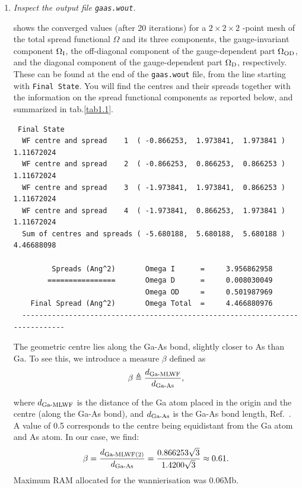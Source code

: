 \begin{enumerate}

\item {\it Inspect the output file {\tt gaas.wout}.}

 shows the converged values (after 20 iterations) for a $2\times2\times2$ \bfk-point mesh of the total spread functional $\Omega$ and its three components, \ie{} the gauge-invariant component $\Omega\tinysub{I}$, the off-diagonal component of the gauge-dependent part $\Omega\tinysub{OD}$, and the diagonal component of the gauge-dependent part $\Omega\tinysub{D}$, respectively. These can be found at the end of the {\tt gaas.wout} file, from the line starting with {\tt Final State}. You will find the \MLWF{} centres and their spreads together with the information on the spread functional components as reported below, and summarized in tab.\ref{tab1.1}.
\begin{tcolorbox}[sharp corners,boxrule=0.5pt]
{\small
\begin{verbatim}
 Final State
  WF centre and spread    1  ( -0.866253,  1.973841,  1.973841 )     1.11672024
  WF centre and spread    2  ( -0.866253,  0.866253,  0.866253 )     1.11672024
  WF centre and spread    3  ( -1.973841,  1.973841,  0.866253 )     1.11672024
  WF centre and spread    4  ( -1.973841,  0.866253,  1.973841 )     1.11672024
  Sum of centres and spreads ( -5.680188,  5.680188,  5.680188 )     4.46688098
  
         Spreads (Ang^2)       Omega I      =     3.956862958
        ================       Omega D      =     0.008030049
                               Omega OD     =     0.501987969
    Final Spread (Ang^2)       Omega Total  =     4.466880976
  -----------------------------------------------------------------------------
\end{verbatim}
}
\end{tcolorbox}
The geometric centre lies along the Ga-As bond, slightly closer to As than Ga. To see this, we introduce a measure $\beta$ defined as 
$$\beta \triangleq \frac{d\tinysub{Ga-MLWF}}{d\tinysub{Ga-As}},$$

where $d\tinysub{Ga-MLWF}$ is the distance of the Ga atom placed in the origin and the \MLWF{} centre (along the Ga-As bond), and $d\tinysub{Ga-As}$ is the Ga-As bond length, \cf{} Ref.~\cite{marzarivanderbilt1997}. A value of 0.5 corresponds to the \MLWF{} centre being equidistant from the Ga atom and As atom. 
In our case, we find: $$\beta = \frac{d\tinysub{Ga-MLWF(2)}}{d\tinysub{Ga-As}} = \frac{0.866253\sqrt{3}}{1.4200\sqrt{3}} \approx 0.61 .$$
Maximum RAM allocated for the wannierisation was 0.06Mb.


\end{enumerate}

